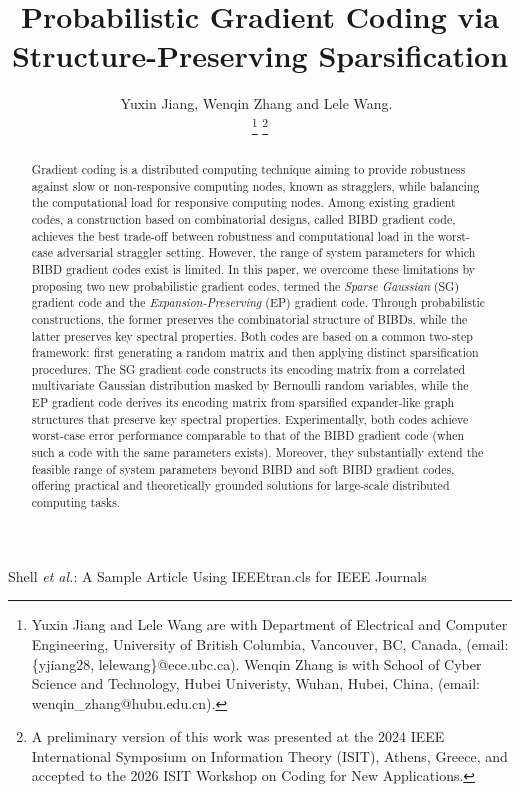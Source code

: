 \documentclass[lettersize,journal]{IEEEtran}
\newcommand{\TODO}{\textcolor{red}}
\begin{document}
\allowdisplaybreaks
\title{Probabilistic Gradient Coding via Structure-Preserving Sparsification}

\author{Yuxin Jiang, Wenqin Zhang and Lele Wang.~\IEEEmembership{}

\thanks{Yuxin Jiang and Lele Wang are with Department of Electrical and Computer Engineering, University of British Columbia, Vancouver, BC, Canada, (email:\{yjiang28, lelewang\}@ece.ubc.ca).
Wenqin Zhang is with School of Cyber Science and Technology, Hubei Univeristy, Wuhan, Hubei, China, (email: wenqin\_zhang@hubu.edu.cn).
}
\thanks{A preliminary version of this work was presented at the 2024 IEEE International Symposium on Information Theory (ISIT), Athens, Greece, and accepted to the 2026 ISIT Workshop on Coding for New Applications.}}

\markboth{
}%
{Shell \MakeLowercase{\textit{et al.}}: A Sample Article Using IEEEtran.cls for IEEE Journals}

\IEEEpubid{
}

\maketitle

\begin{abstract}
Gradient coding is a distributed computing technique aiming to provide robustness against slow or non-responsive computing nodes, known as stragglers, while balancing the computational load for responsive computing nodes. Among existing gradient codes, a construction based on combinatorial designs, called BIBD gradient code, achieves the best trade-off between robustness and computational load in the worst-case adversarial straggler setting. However, the range of system parameters for which BIBD gradient codes exist is limited. In this paper, we overcome these limitations by proposing two new probabilistic gradient codes, termed the \emph{Sparse Gaussian} (SG) gradient code and the \emph{Expansion-Preserving} (EP) gradient code. 
Through probabilistic constructions, the former preserves the combinatorial structure of BIBDs, while the latter preserves key spectral properties. Both codes are based on a common two-step framework: first generating a random matrix and then applying distinct sparsification procedures. The SG gradient code constructs its encoding matrix from a correlated multivariate Gaussian distribution masked by Bernoulli random variables, while the EP gradient code derives its encoding matrix from sparsified expander-like graph structures that preserve key spectral properties. Experimentally, both codes achieve worst-case error performance comparable to that of the BIBD gradient code (when such a code with the same parameters exists). Moreover, they substantially extend the feasible range of system parameters beyond BIBD and soft BIBD gradient codes, offering practical and theoretically grounded solutions for large-scale distributed computing tasks.
\end{abstract}
\end{document}
